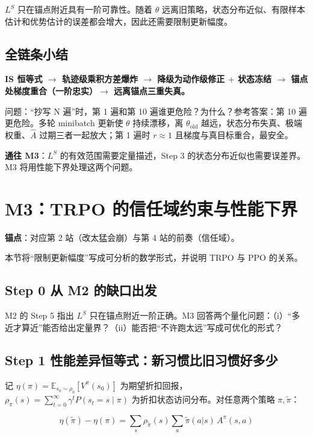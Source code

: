 \documentclass[UTF8,12pt,a4paper]{ctexrep}
\newcommand{\pin}[1]{\begin{pinbox}#1\end{pinbox}}
\newcommand{\selfcheck}[1]{\begin{checkb}#1\end{checkb}}
\newcommand{\flow}[1]{\par\medskip\noindent
  \begin{tcolorbox}[colback=main!6,colframe=main!6,boxrule=0pt,arc=2pt,
    left=8pt,right=8pt,top=5pt,bottom=5pt,halign=center,
    before skip=8pt,after skip=8pt]
    \color{main!85!black}\bfseries #1
  \end{tcolorbox}\par\medskip}
\begin{document}
\pin{$L^{S}$ 只在锚点附近具有一阶可靠性。随着 $\theta$ 远离旧策略，状态分布近似、有限样本估计和优势估计的误差都会增大，因此还需要限制更新幅度。}

\subsection*{全链条小结}

\flow{IS 恒等式 $\to$ 轨迹级乘积方差爆炸 $\to$ 降级为动作级修正 $+$ 状态冻结 $\to$ 锚点处梯度重合（一阶忠实）$\to$ 远离锚点三重失真。}

\selfcheck{问题：``抄写 N 遍''时，第 1 遍和第 10 遍谁更危险？为什么？\quad 参考答案：第 10 遍更危险。多轮 minibatch 更新使 $\theta$ 持续漂移，离 $\theta_{\mathrm{old}}$ 越远，状态分布失真、极端权重、$\hat{A}$ 过期三者一起放大；第 1 遍时 $r \approx 1$ 且梯度与真目标重合，最安全。}

\textbf{通往 M3}：$L^S$ 的有效范围需要定量描述，Step 3 的状态分布近似也需要误差界。M3 将用性能下界处理这两个问题。

\section{M3：TRPO 的信任域约束与性能下界}

\textbf{锚点}：对应第 2 站（改太猛会崩）与第 4 站的前奏（信任域）。

本节将``限制更新幅度''写成可分析的数学形式，并说明 TRPO 与 PPO 的关系。

\subsection*{Step 0 \; 从 M2 的缺口出发}

M2 的 Step 5 指出 $L^{S}$ 只在锚点附近一阶正确。M3 回答两个量化问题：（i）``多近才算近''能否给出定量界？（ii）能否把``不许跑太远''写成可优化的形式？

\subsection*{Step 1 \; 性能差异恒等式：新习惯比旧习惯好多少}

记 $\eta(\pi) = \mathbb{E}_{s_0 \sim \rho_0}\left[V^{\pi}(s_0)\right]$ 为期望折扣回报，$\rho_\pi(s) = \sum_{t=0}^{\infty}\gamma^t P(s_t = s \mid \pi)$ 为折扣状态访问分布。对任意两个策略 $\pi, \tilde\pi$：

$$
\eta(\tilde\pi) - \eta(\pi) = \sum_{s}\rho_{\tilde\pi}(s)\sum_{a}\tilde\pi(a|s)\, A^{\pi}(s,a)
$$
\end{document}
